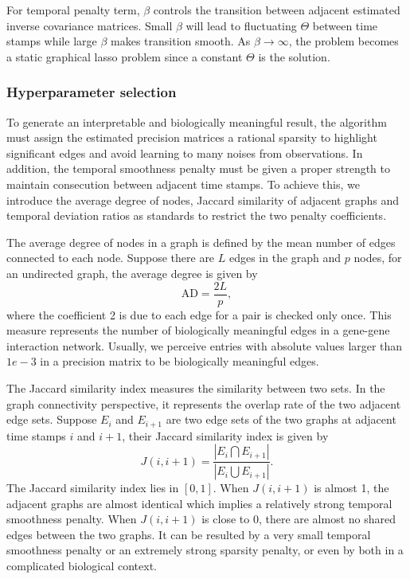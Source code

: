 For temporal penalty term, $\beta$ controls the transition between adjacent estimated inverse covariance matrices. 
Small $\beta$ will lead to fluctuating $\Theta$ between time stamps 
while large $\beta$ makes transition smooth. 
As $\beta\longrightarrow\infty$, 
the problem becomes a static graphical lasso problem since a constant $\Theta$ is the solution.

\subsubsection{Hyperparameter selection}
To generate an interpretable and biologically meaningful result, 
the algorithm must assign the estimated precision matrices a rational sparsity to highlight significant edges and avoid learning to many noises from observations. 
In addition, the temporal smoothness penalty must be given a proper strength to maintain consecution between adjacent time stamps. 
To achieve this, we introduce the average degree of nodes, Jaccard similarity of adjacent graphs and temporal deviation ratios as standards to restrict the two penalty coefficients. 

The average degree of nodes in a graph is defined by the mean number of edges connected to each node. 
Suppose there are $L$ edges in the graph and $p$ nodes, for an undirected graph, 
the average degree is given by 
\begin{equation*}
    \text{AD} = \frac{2L}{p}, 
\end{equation*}
where the coefficient 2 is due to each edge for a pair is checked only once. 
This measure represents the number of biologically meaningful edges in a gene-gene interaction network. 
Usually, we perceive entries with absolute values larger than $1e-3$ in a precision matrix to be biologically 
meaningful edges. 

The Jaccard similarity index measures the similarity between two sets. 
In the graph connectivity perspective, it represents the overlap rate of the two adjacent edge sets. 
Suppose $E_i$ and $E_{i+1}$ are two edge sets of the two graphs at adjacent time stamps $i$ and $i+1$, 
their Jaccard similarity index is given by 
\begin{equation*}
    J(i,i+1) = \frac{|E_i\bigcap E_{i+1}|}{|E_i\bigcup E_{i+1}|}.
\end{equation*} 
The Jaccard similarity index lies in $[0,1]$. 
When $J(i,i+1)$ is almost 1, the adjacent graphs are almost identical which implies a relatively strong temporal smoothness penalty. 
When $J(i,i+1)$ is close to 0, there are almost no shared edges between the two graphs. 
It can be resulted by a very small temporal smoothness penalty or an extremely strong sparsity penalty, 
or even by both in a complicated biological context. 

